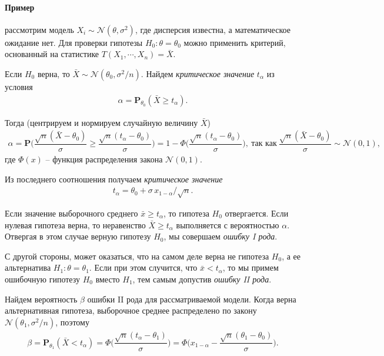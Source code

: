 \documentclass[%
	11pt,
	a4paper,
	utf8,
		]{article}
\begin{document}
\paragraph{Пример} рассмотрим модель $ X_i \sim \mathcal{N}(\theta, \sigma^2) $, где дисперсия известна, а математическое ожидание нет. Для проверки гипотезы $ H_0: \theta = \theta_0 $ можно применить критерий, основанный на статистике $ T(X_1, \cdots, X_n) = \bar{X} $.

Если $ H_0 $ верна, то $ \bar{X} \sim \mathcal{N}(\theta_0, \sigma^2/n) $. Найдем \emph{критическое значение} $ t_\alpha $ из условия
\begin{align*}
	\alpha = \mathbf{P}_{\theta_0} (\bar{X} \geqslant t_\alpha).
\end{align*}

Тогда (центрируем и нормируем случайную величину $ \bar{X} $)
\begin{align*}
	\alpha = \mathbf{P} \Bigg( \dfrac{\sqrt{n} (\bar{X} - \theta_0)}{\sigma} \geqslant \dfrac{\sqrt{n} (t_\alpha - \theta_0)}{\sigma} \Bigg) = 1 - \Phi\Bigg(\dfrac{\sqrt{n} (t_\alpha - \theta_0)}{\sigma}\Bigg), \ \text{так как} \ \dfrac{\sqrt{n} (\bar{X} - \theta_0)}{\sigma} \sim \mathcal{N}(0, 1),
\end{align*}
где $ \Phi(x) $ -- функция распределения закона $ \mathcal{N}(0, 1) $.

Из последнего соотношения получаем \emph{критическое значение}
\begin{align*}
	t_\alpha = \theta_0 + \sigma \, x_{1 - \alpha} / \sqrt{n}.
\end{align*}

Если значение выборочного среднего $ \bar{x} \geqslant t_\alpha$, то гипотеза $ H_0 $ отвергается. Если нулевая гипотеза верна, то неравенство $ \bar{X} \geqslant t_\alpha $ выполняется с вероятностью $ \alpha $. Отвергая в этом случае верную гипотезу $ H_0 $, мы совершаем \emph{ошибку I рода}.

С другой стороны, может оказаться, что на самом деле верна не гипотеза $ H_0 $, а ее альтернатива $ H_1 : \theta = \theta_1$. Если при этом случится, что $ \bar{x} < t_\alpha $, то мы примем ошибочную гипотезу $ H_0 $ вместо $ H_1 $, тем самым допустив \emph{ошибку II рода}.

Найдем вероятность $ \beta $ ошибки II рода для рассматриваемой модели. Когда верна альтернативная гипотеза, выборочное среднее распределено по закону $ \mathcal{N}(\theta_1, \sigma^2/n)$, поэтому
\begin{align*}
	\beta = \mathbf{P}_{\theta_1}(\bar{X} < t_\alpha) = \Phi \Bigg( \dfrac{ \sqrt{n}(t_\alpha - \theta_1) }{\sigma} \Bigg) = \Phi \Bigg( x_{1 - \alpha} - \dfrac{ \sqrt{n}(\theta_1 - \theta_0) }{\sigma} \Bigg).
\end{align*}
\end{document}
